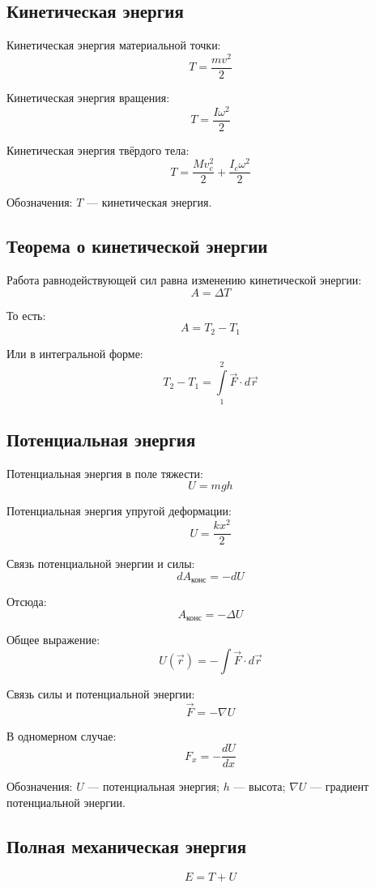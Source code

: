 \documentclass[a4paper,12pt]{article}
\begin{document}
\subsection{Кинетическая энергия}

Кинетическая энергия материальной точки:
\[
T = \frac{m v^2}{2}
\]

Кинетическая энергия вращения:
\[
T = \frac{I \omega^2}{2}
\]

Кинетическая энергия твёрдого тела:
\[
T = \frac{M v_c^2}{2} + \frac{I_c \omega^2}{2}
\]

Обозначения:  
\(T\) — кинетическая энергия.

\subsection{Теорема о кинетической энергии}

Работа равнодействующей сил равна изменению кинетической энергии:
\[
A = \Delta T
\]

То есть:
\[
A = T_2 - T_1
\]

Или в интегральной форме:
\[
T_2 - T_1 = \int\limits_{1}^{2} \vec F \cdot d\vec r
\]

\subsection{Потенциальная энергия}

Потенциальная энергия в поле тяжести:
\[
U = m g h
\]

Потенциальная энергия упругой деформации:
\[
U = \frac{k x^2}{2}
\]

Связь потенциальной энергии и силы:
\[
dA_{\text{конс}} = -dU
\]

Отсюда:
\[
A_{\text{конс}} = -\Delta U
\]

Общее выражение:
\[
U\left(\vec r\right) = - \int \vec F \cdot d\vec r
\]

Связь силы и потенциальной энергии:
\[
\vec F = - \nabla U
\]

В одномерном случае:
\[
F_x = - \frac{dU}{dx}
\]

Обозначения:  
\(U\) — потенциальная энергия;  
\(h\) — высота;  
\(\nabla U\) — градиент потенциальной энергии.

\subsection{Полная механическая энергия}

\[
E = T + U
\]
\end{document}
